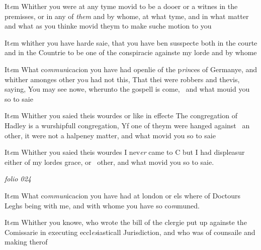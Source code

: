 \documentclass[12pt, a4paper]{book}
\begin{document}
		\ifthenelse{\isodd{\thepage}}
		{\reversemarginpar}
		{\normalmarginpar}
		It\textit{e}m Whither you were at any tyme movid to be a
 dooer or a witnes in the premisses, or in any of \textit{them}
 and by whome, at what tyme, and in what matter
 and what as you thinke movid theym to make suche
 motion to you
 	
		\ifthenelse{\isodd{\thepage}}
		{\reversemarginpar}
		{\normalmarginpar}
		It\textit{e}m whither you have harde saie, that you have ben
 susspecte both in the courte and in the Countrie to be
 one of the conspiracie againste my lorde and by whome
 	
		\ifthenelse{\isodd{\thepage}}
		{\reversemarginpar}
		{\normalmarginpar}
		
 It\textit{e}m What co\textit{mmun}icacion you have had openlie of the p\textit{rin}ces
 of Germanye, and whither amonges other yo\textit{u} had
 not this, That thei were robbers and thevis, saying,
 You may see nowe, wherunto the gospell is come, 
 and what mouid you so to saie
 	
		\ifthenelse{\isodd{\thepage}}
		{\reversemarginpar}
		{\normalmarginpar}
		
 It\textit{e}m Whither you saied theis wourdes or like in effecte
 The congregation of Hadley is a wurshipfull
 congregation, Yf one of theym were hanged against 
 an other, it were not a halpeney matter, and what
 movid you so to saie
 	
		\ifthenelse{\isodd{\thepage}}
		{\reversemarginpar}
		{\normalmarginpar}
		
 		It\textit{e}m Whither you saied theis wourdes I nev\textit{er} came to C
 		but I had displeasur either of my lordes grace, or 
 other, and what movid you so to saie.

\dotfill
						\newpage
{}

\textit{folio 024}



 	
		\ifthenelse{\isodd{\thepage}}
		{\reversemarginpar}
		{\normalmarginpar}
		It\textit{e}m What co\textit{mmun}icacion you have had at london or els where
 of Doctours Leghs being with me, and with whome you
 have so co\textit{m}muned.
 	
		\ifthenelse{\isodd{\thepage}}
		{\reversemarginpar}
		{\normalmarginpar}
		
 It\textit{e}m Whither you knowe, who wrote the bill of the clergie
 put up againste the Comissarie in executing eccl\textit{es}iasticall
 Jurisdiction, and who was of counsaile and making
 therof
\end{document}
